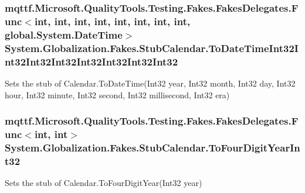 \hypertarget{class_system_1_1_globalization_1_1_fakes_1_1_stub_calendar_af84a8e567da3f0854bee0a14bf12d2f4}{
\subsubsection[{To\-Date\-Time\-Int32\-Int32\-Int32\-Int32\-Int32\-Int32\-Int32\-Int32}]{\setlength{\rightskip}{0pt plus 5cm}mqttf.\-Microsoft.\-Quality\-Tools.\-Testing.\-Fakes.\-Fakes\-Delegates.\-Func$<$int, int, int, int, int, int, int, int, global.\-System.\-Date\-Time$>$ System.\-Globalization.\-Fakes.\-Stub\-Calendar.\-To\-Date\-Time\-Int32\-Int32\-Int32\-Int32\-Int32\-Int32\-Int32\-Int32}}\label{class_system_1_1_globalization_1_1_fakes_1_1_stub_calendar_af84a8e567da3f0854bee0a14bf12d2f4}


Sets the stub of Calendar.\-To\-Date\-Time(\-Int32 year, Int32 month, Int32 day, Int32 hour, Int32 minute, Int32 second, Int32 millisecond, Int32 era)

\hypertarget{class_system_1_1_globalization_1_1_fakes_1_1_stub_calendar_a75c4247cb30ca8a8eecbce291c5b9a14}{
\subsubsection[{To\-Four\-Digit\-Year\-Int32}]{\setlength{\rightskip}{0pt plus 5cm}mqttf.\-Microsoft.\-Quality\-Tools.\-Testing.\-Fakes.\-Fakes\-Delegates.\-Func$<$int, int$>$ System.\-Globalization.\-Fakes.\-Stub\-Calendar.\-To\-Four\-Digit\-Year\-Int32}}\label{class_system_1_1_globalization_1_1_fakes_1_1_stub_calendar_a75c4247cb30ca8a8eecbce291c5b9a14}


Sets the stub of Calendar.\-To\-Four\-Digit\-Year(\-Int32 year)


